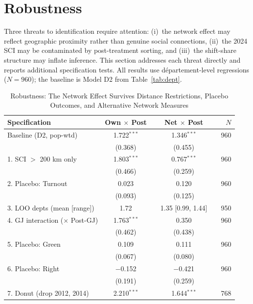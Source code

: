 \documentclass[12pt]{article}
\newcommand{\dept}{d\'{e}partement}
\begin{document}
\section{Robustness}
\label{sec:robustness}

Three threats to identification require attention: (i)~the network effect may reflect geographic proximity rather than genuine social connections, (ii)~the 2024 SCI may be contaminated by post-treatment sorting, and (iii)~the shift-share structure may inflate inference. This section addresses each threat directly and reports additional specification tests. All results use \dept{}-level regressions ($N = 960$); the baseline is Model D2 from Table~\ref{tab:dept}.

\begin{table}[H]
\centering
\caption[Robustness Checks]{Robustness: The Network Effect Survives Distance Restrictions, Placebo Outcomes, and Alternative Network Measures}
\label{tab:robustness}
\begin{threeparttable}
\begin{tabular}{@{}lccccr@{}}
\toprule
Specification & Own $\times$ Post & & Net $\times$ Post & & $N$ \\
\midrule
Baseline (D2, pop-wtd)  & 1.722$^{***}$ & & 1.346$^{***}$ & & 960 \\
                     & (0.368) & & (0.455) & & \\[3pt]
1. SCI $>$ 200 km only   & 1.803$^{***}$ & & 0.767$^{***}$ & & 960 \\
                     & (0.466) & & (0.259) & & \\[3pt]
2. Placebo: Turnout  & 0.023 & & 0.120 & & 960 \\
                     & (0.093) & & (0.125) & & \\[3pt]
3. LOO depts (mean [range])  & 1.72 & & 1.35 [0.99, 1.44] & & 950 \\[3pt]
4. GJ interaction ($\times$ Post-GJ)  & 1.763$^{***}$ & & 0.350 & & 960 \\
                     & (0.462) & & (0.438) & & \\[3pt]
5. Placebo: Green     & 0.109 & & 0.111 & & 960 \\
                     & (0.067) & & (0.080) & & \\[3pt]
6. Placebo: Right     & $-$0.152 & & $-$0.421 & & 960 \\
                     & (0.191) & & (0.259) & & \\[3pt]
7. Donut (drop 2012, 2014) & 2.210$^{***}$ & & 1.644$^{***}$ & & 768 \\

\end{tabular}
\end{threeparttable}
\end{table}
\end{document}
